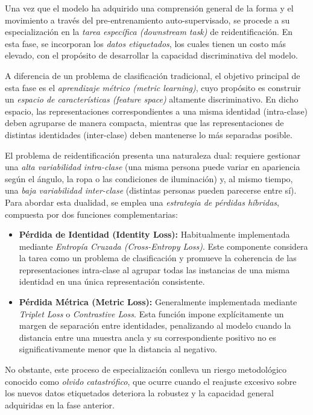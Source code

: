 Una vez que el modelo ha adquirido una comprensión general de la forma y el movimiento a través del pre-entrenamiento auto-supervisado, se procede a su especialización en la \textit{tarea específica (downstream task)} de reidentificación. En esta fase, se incorporan los \textit{datos etiquetados}, los cuales tienen un costo más elevado, con el propósito de desarrollar la capacidad discriminativa del modelo.  

A diferencia de un problema de clasificación tradicional, el objetivo principal de esta fase es el \textit{aprendizaje métrico (metric learning)}, cuyo propósito es construir un \textit{espacio de características (feature space)} altamente discriminativo. En dicho espacio, las representaciones correspondientes a una misma identidad (intra-clase) deben agruparse de manera compacta, mientras que las representaciones de distintas identidades (inter-clase) deben mantenerse lo más separadas posible.  

El problema de reidentificación presenta una naturaleza dual: requiere gestionar una \textit{alta variabilidad intra-clase} (una misma persona puede variar en apariencia según el ángulo, la ropa o las condiciones de iluminación) y, al mismo tiempo, una \textit{baja variabilidad inter-clase} (distintas personas pueden parecerse entre sí). Para abordar esta dualidad, se emplea una \textit{estrategia de pérdidas híbridas}, compuesta por dos funciones complementarias:

\begin{itemize}
    \item \textbf{Pérdida de Identidad (Identity Loss):} Habitualmente implementada mediante \textit{Entropía Cruzada (Cross-Entropy Loss)}. Este componente considera la tarea como un problema de clasificación y promueve la coherencia de las representaciones intra-clase al agrupar todas las instancias de una misma identidad en una única representación consistente.
    
    \item \textbf{Pérdida Métrica (Metric Loss):} Generalmente implementada mediante \textit{Triplet Loss} o \textit{Contrastive Loss}. Esta función impone explícitamente un margen de separación entre identidades, penalizando al modelo cuando la distancia entre una muestra ancla y su correspondiente positivo no es significativamente menor que la distancia al negativo.
\end{itemize}

No obstante, este proceso de especialización conlleva un riesgo metodológico conocido como \textit{olvido catastrófico}, que ocurre cuando el reajuste excesivo sobre los nuevos datos etiquetados deteriora la robustez y la capacidad general adquiridas en la fase anterior.  

